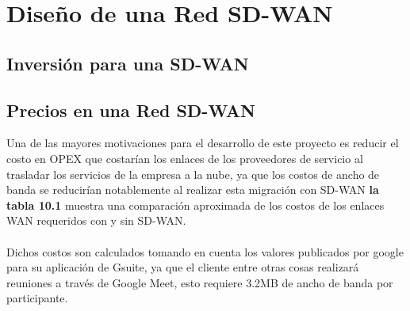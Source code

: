 
\chapter{Diseño de una Red SD-WAN}
\label{cha:Diseño de una Red SD-WAN}

\section{Inversión para una SD-WAN} %
\label{sec:Inversión para una SD-WAN}

\section{Precios en una Red SD-WAN} %
\label{sec:Precios en una Red SD-WAN}

Una de las mayores motivaciones para el desarrollo de este proyecto es reducir el costo en OPEX que costarían los enlaces de los proveedores de servicio al trasladar los servicios de la empresa a la nube, ya que los costos de ancho de banda se reducirían notablemente al realizar esta migración con SD-WAN \textbf{la tabla 10.1} muestra una comparación aproximada de los costos de los enlaces WAN requeridos con y sin SD-WAN. 
\\
\\
Dichos costos son calculados tomando en cuenta los valores publicados por google para su aplicación de Gsuite, ya que el cliente entre otras cosas realizará reuniones a través de Google Meet, esto requiere 3.2MB de ancho de banda por participante.

